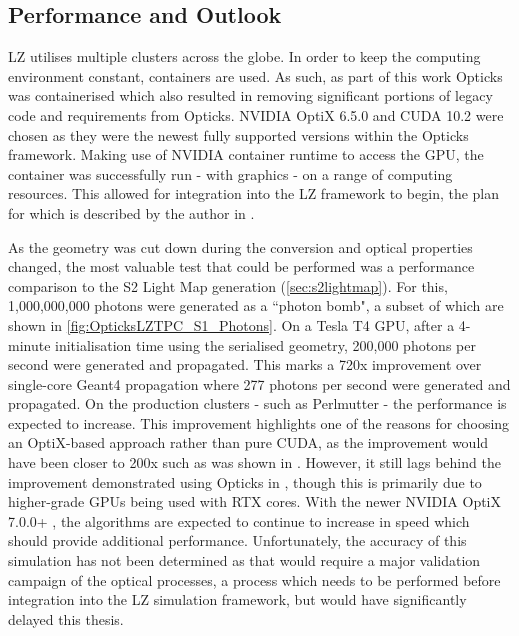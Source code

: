 \subsection{Performance and Outlook}
\par
LZ utilises multiple clusters across the globe.
In order to keep the computing environment constant, containers are used.
As such, as part of this work Opticks was containerised \cite{opticks_docker_ref} which also resulted in removing significant portions of legacy code and requirements from Opticks.
NVIDIA OptiX 6.5.0 and CUDA 10.2 were chosen as they were the newest fully supported versions within the Opticks framework.
Making use of NVIDIA container runtime to access the GPU, the container was successfully run - with graphics - on a range of computing resources.
This allowed for integration into the LZ framework to begin, the plan for which is described by the author in \cite{SEriksen_Opticks_CHEP_2021_ref,lz_status_with_opticks_ref}.
\par
As the geometry was cut down during the conversion and optical properties changed, the most valuable test that could be performed was a performance comparison to the S2 Light Map generation (\autoref{sec:s2lightmap}).
For this, 1,000,000,000 photons were generated as a ``photon bomb", a subset of which are shown in \autoref{fig:OpticksLZTPC_S1_Photons}.
On a Tesla T4 GPU, after a 4-minute initialisation time using the serialised geometry, 200,000 photons per second were generated and propagated.
This marks a 720x improvement over single-core Geant4 propagation where 277 photons per second were generated and propagated.
On the production clusters - such as Perlmutter - the performance is expected to increase.
This improvement highlights one of the reasons for choosing an OptiX-based approach rather than pure CUDA, as the improvement would have been closer to 200x such as was shown in \cite{chroma_presentation_ref}.
However, it still lags behind the improvement demonstrated using Opticks in \cite{Opticks_CHEP_2019_ref}, though this is primarily due to higher-grade GPUs being used with RTX cores.
With the newer NVIDIA OptiX 7.0.0+ \cite{NVidiaOptiX_7_ref}, the algorithms are expected to continue to increase in speed which should provide additional performance.
Unfortunately, the accuracy of this simulation has not been determined as that would require a major validation campaign of the optical processes, a process which needs to be performed before integration into the LZ simulation framework, but would have significantly delayed this thesis.


